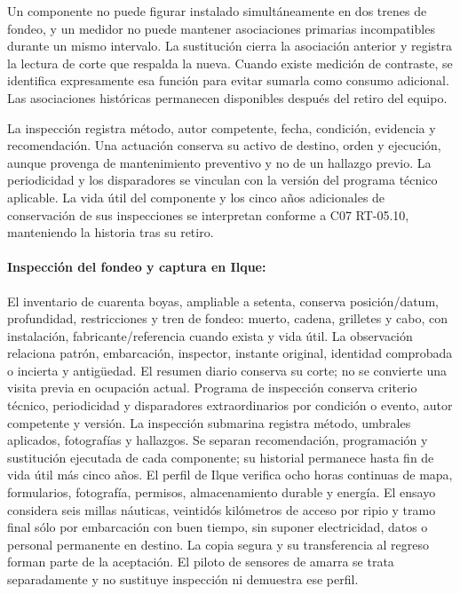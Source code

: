 Un componente no puede figurar instalado simultáneamente en dos trenes de fondeo, y un medidor no puede mantener asociaciones primarias incompatibles durante un mismo intervalo. La sustitución cierra la asociación anterior y registra la lectura de corte que respalda la nueva. Cuando existe medición de contraste, se identifica expresamente esa función para evitar sumarla como consumo adicional. Las asociaciones históricas permanecen disponibles después del retiro del equipo.

La inspección registra método, autor competente, fecha, condición, evidencia y recomendación. Una actuación conserva su activo de destino, orden y ejecución, aunque provenga de mantenimiento preventivo y no de un hallazgo previo. La periodicidad y los disparadores se vinculan con la versión del programa técnico aplicable. La vida útil del componente y los cinco años adicionales de conservación de sus inspecciones se interpretan conforme a C07 RT-05.10, manteniendo la historia tras su retiro.

\paragraph{Inspección del fondeo y captura en Ilque:}
El inventario de cuarenta boyas, ampliable a setenta, conserva posición/datum, profundidad, restricciones y tren de fondeo: muerto, cadena, grilletes y cabo, con instalación, fabricante/referencia cuando exista y vida útil. La observación relaciona patrón, embarcación, inspector, instante original, identidad comprobada o incierta y antigüedad. El resumen diario conserva su corte; no se convierte una visita previa en ocupación actual.
Programa de inspección conserva criterio técnico, periodicidad y disparadores extraordinarios por condición o evento, autor competente y versión. La inspección submarina registra método, umbrales aplicados, fotografías y hallazgos. Se separan recomendación, programación y sustitución ejecutada de cada componente; su historial permanece hasta fin de vida útil más cinco años.
El perfil de Ilque verifica ocho horas continuas de mapa, formularios, fotografía, permisos, almacenamiento durable y energía. El ensayo considera seis millas náuticas, veintidós kilómetros de acceso por ripio y tramo final sólo por embarcación con buen tiempo, sin suponer electricidad, datos o personal permanente en destino. La copia segura y su transferencia al regreso forman parte de la aceptación. El piloto de sensores de amarra se trata separadamente y no sustituye inspección ni demuestra ese perfil.

